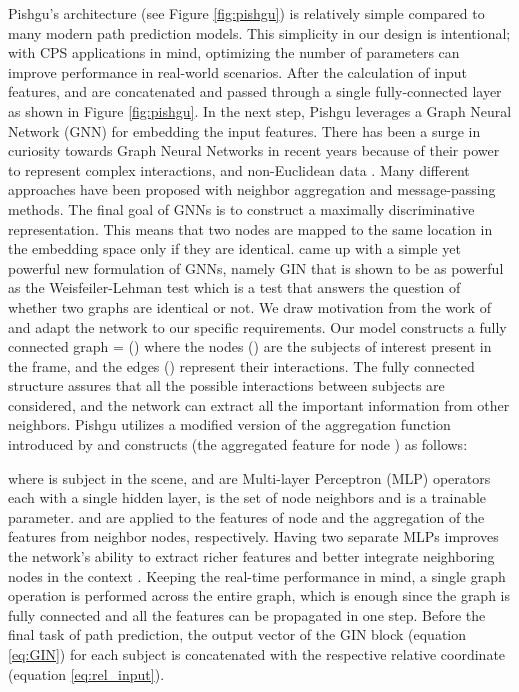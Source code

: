 \documentclass[sigconf]{acmart}
\begin{document}
Pishgu's architecture (see Figure \ref{fig:pishgu}) is relatively simple compared to many modern path prediction models. This simplicity in our design is intentional; with CPS applications in mind, optimizing the number of parameters can improve performance in real-world scenarios. After the calculation of input features,  and  are concatenated and passed through a single fully-connected layer  as shown in Figure \ref{fig:pishgu}. In the next step, Pishgu leverages a Graph Neural Network (GNN) for embedding the input features. There has been a surge in curiosity towards Graph Neural Networks in recent years because of their power to represent complex interactions, and non-Euclidean data \cite{xu2018powerful,velivckovic2017graph, kipf2016semi}. Many different approaches have been proposed with neighbor aggregation and message-passing methods. The final goal of GNNs is to construct a maximally discriminative representation. This means that two nodes are mapped to the same location in the embedding space only if they are identical. \cite{xu2018powerful} came up with a simple yet powerful new formulation of GNNs, namely GIN that is shown to be as powerful as the Weisfeiler-Lehman test \cite{leman1968reduction} which is a test that answers the question of whether two graphs are identical or not. We draw motivation from the work of \cite{xu2018powerful} and adapt the network to our specific requirements. Our model constructs a fully connected graph  = () where the nodes () are the subjects of interest present in the frame, and the edges () represent their interactions. The fully connected structure assures that all the possible interactions between subjects are considered, and the network can extract all the important information from other neighbors. Pishgu utilizes a modified version of the aggregation function introduced by \cite{xu2018powerful} and constructs  (the aggregated feature for node ) as follows:


where  is  subject in the scene,  and  are Multi-layer Perceptron (MLP) operators each with a single hidden layer,  is the set of node  neighbors and  is a trainable parameter.   and  are applied to the features of node  and the aggregation of the features from neighbor nodes, respectively. Having two separate MLPs improves the network's ability to extract richer features and better integrate neighboring nodes in the context \cite{mendieta2021carpe}. Keeping the real-time performance in mind, a single graph operation is performed across the entire graph, which is enough since the graph is fully connected and all the features can be propagated in one step. Before the final task of path prediction, the output vector of the GIN block (equation \ref{eq:GIN}) for each subject is concatenated with the respective relative coordinate (equation \ref{eq:rel_input}).
\end{document}

